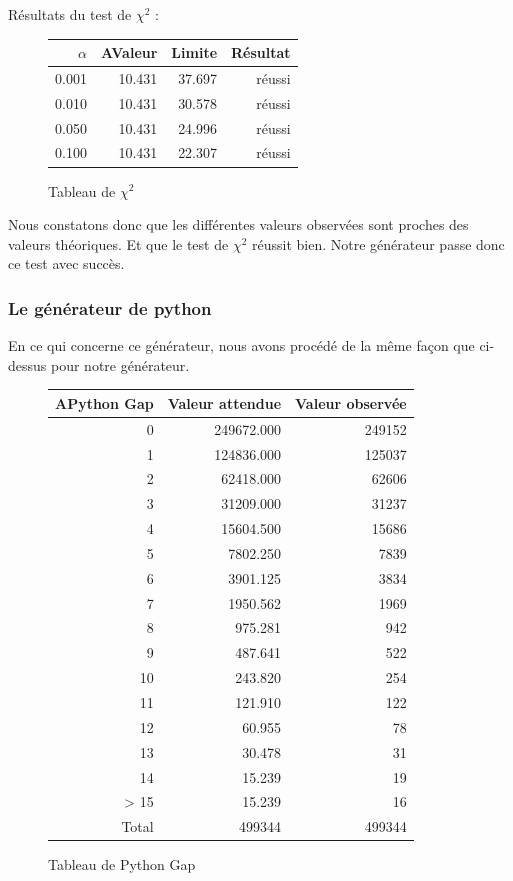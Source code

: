 \documentclass[10pt,a4paper]{article}
\begin{document}
Résultats du test de $\chi^2$ :
\begin{figure}[h]
	\centering
	\begin{tabular}{|r|r|r|r|}
		\hline
		$\alpha$ & AValeur & Limite & Résultat\\
		\hline
		0.001 & 10.431 & 37.697 & réussi\\
		0.010 & 10.431 & 30.578 & réussi\\
		0.050 & 10.431 & 24.996 & réussi\\
		0.100 & 10.431 & 22.307 & réussi\\
		\hline
	\end{tabular}
	\caption{Tableau de $\chi^2$}
\end{figure}


Nous constatons donc que les différentes valeurs observées sont proches des valeurs théoriques. Et que le test de $\chi^2$ réussit bien. Notre générateur passe donc ce test avec succès.

\newpage

	\subsubsection{Le générateur de python}
En ce qui concerne ce générateur, nous avons procédé de la même façon que ci-dessus pour notre générateur.
	
\begin{figure}[h]
	\centering
	\begin{tabular}{|r|r|r|}
		\hline
		APython Gap & Valeur attendue & Valeur observée\\
		\hline
		0 & 249672.000 & 249152\\
		1 & 124836.000 & 125037\\
		2 & 62418.000 & 62606\\
		3 & 31209.000 & 31237\\
		4 & 15604.500 & 15686\\
		5 & 7802.250 & 7839\\
		6 & 3901.125 & 3834\\
		7 & 1950.562 & 1969\\
		8 & 975.281 & 942\\
		9 & 487.641 & 522\\
		10 & 243.820 & 254\\
		11 & 121.910 & 122\\
		12 & 60.955 & 78\\
		13 & 30.478 & 31\\
		14 & 15.239 & 19\\
		> 15 & 15.239 & 16\\
		\hline
		Total & 499344 & 499344\\
		\hline
	\end{tabular}
	\caption{Tableau de Python Gap}
\end{figure}
\end{document}
